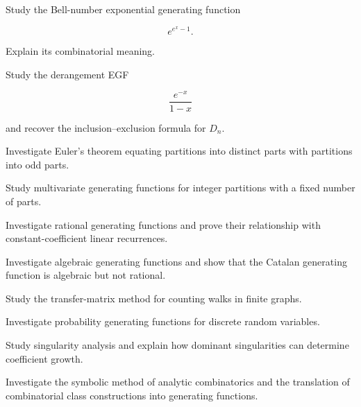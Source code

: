 \begin{exercise}[4]
Study the Bell-number exponential generating function

\[
e^{e^x-1}.
\]

Explain its combinatorial meaning.
\end{exercise}

\begin{exercise}[4]
Study the derangement EGF

\[
\frac{e^{-x}}{1-x}
\]

and recover the inclusion--exclusion formula for \(D_n\).
\end{exercise}

\begin{exercise}[4]
Investigate Euler's theorem equating partitions into distinct parts with
partitions into odd parts.
\end{exercise}

\begin{exercise}[4]
Study multivariate generating functions for integer partitions with a
fixed number of parts.
\end{exercise}

\begin{exercise}[4]
Investigate rational generating functions and prove their relationship
with constant-coefficient linear recurrences.
\end{exercise}

\begin{exercise}[4]
Investigate algebraic generating functions and show that the Catalan
generating function is algebraic but not rational.
\end{exercise}

\begin{exercise}[4]
Study the transfer-matrix method for counting walks in finite graphs.
\end{exercise}

\begin{exercise}[4]
Investigate probability generating functions for discrete random
variables.
\end{exercise}

\begin{exercise}[4]
Study singularity analysis and explain how dominant singularities can
determine coefficient growth.
\end{exercise}

\begin{exercise}[4]
Investigate the symbolic method of analytic combinatorics and the
translation of combinatorial class constructions into generating
functions.
\end{exercise}

